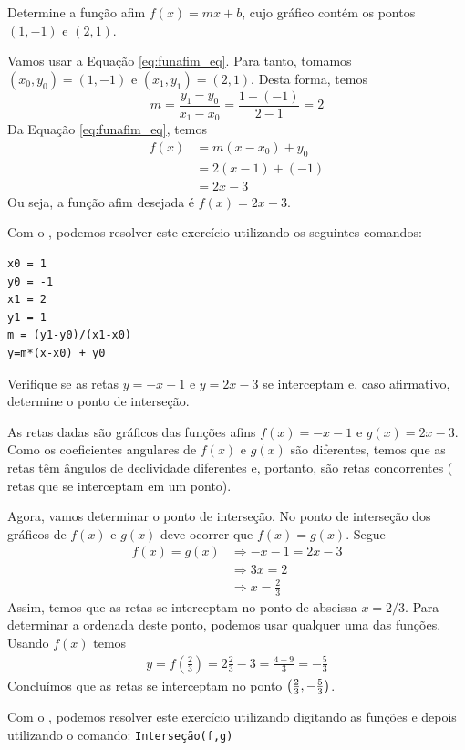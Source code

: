 \documentclass[../main.tex]{subfiles}
\begin{document}
\begin{exeresol}
  Determine a função afim $f(x) = mx + b$, cujo gráfico contém os pontos $(1, -1)$ e $(2, 1)$.\\
  \begin{resol}
  Vamos usar a Equação \ref{eq:funafim_eq}. Para tanto, tomamos $(x_0, y_0) = (1, -1)$ e $(x_1, y_1) = (2, 1)$. Desta forma, temos
  \begin{equation}
    m = \frac{y_1 - y_0}{x_1 - x_0} = \frac{1 - (-1)}{2 - 1} = 2
  \end{equation}
  Da Equação \ref{eq:funafim_eq}, temos
  \begin{align*}
    f(x) &= m(x-x_0) + y_0\\
         &= 2(x - 1) + (-1) \\
         &= 2x -3
  \end{align*}
  Ou seja, a função afim desejada é $f(x) = 2x - 3$.

  Com o \geogebra, podemos resolver este exercício utilizando os seguintes comandos:
\begin{verbatim}
x0 = 1
y0 = -1
x1 = 2
y1 = 1
m = (y1-y0)/(x1-x0)
y=m*(x-x0) + y0
\end{verbatim}
\end{resol}
\end{exeresol}
\begin{exeresol}
  Verifique se as retas $y = -x - 1$ e $y = 2x - 3$ se interceptam e, caso afirmativo, determine o ponto de interseção.\\
  \begin{resol}
  As retas dadas são gráficos das funções afins $f(x) = -x - 1$ e $g(x) = 2x - 3$. Como os coeficientes angulares de $f(x)$ e $g(x)$ são diferentes, temos que as retas têm ângulos de declividade diferentes e, portanto, são retas concorrentes ( retas que se interceptam em um ponto).

  Agora, vamos determinar o ponto de interseção. No ponto de interseção dos gráficos de $f(x)$ e $g(x)$ deve ocorrer que $f(x) = g(x)$. Segue
  \begin{align*}
    f(x)=g(x) &\Rightarrow -x-1 = 2x-3\\
              &\Rightarrow 3x = 2\\
              &\Rightarrow x = \frac{2}{3}
  \end{align*}
  Assim, temos que as retas se interceptam no ponto de abscissa $x = 2/3$. Para determinar a ordenada deste ponto, podemos usar qualquer uma das funções. Usando $f(x)$ temos
  \begin{align*}
    y = f\left(\frac{2}{3}\right) = 2\frac{2}{3} - 3 = \frac{4 - 9}{3} = -\frac{5}{3}
  \end{align*}
  Concluímos que as retas se interceptam no ponto $\left(\frac{2}{3}, -\frac{5}{3}\right)$.

    
    Com o \geogebra, podemos resolver este exercício utilizando digitando as funções e depois utilizando o comando: \verb+Interseção(f,g)+
  \end{resol}
\end{exeresol}
\end{document}
